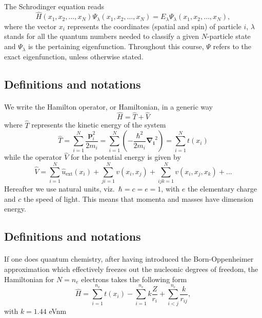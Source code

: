 \documentclass[%
twoside,                 %
final,                   %
10pt]{article}
\begin{document}
\paragraph{}
The Schrodinger equation reads 
\begin{equation}
\hat{H}(x_1, x_2, \dots , x_N) \Psi_{\lambda}(x_1, x_2, \dots , x_N) = 
E_\lambda  \Psi_\lambda(x_1, x_2, \dots , x_N), \label{eq:basicSE1}
\end{equation}
where the vector $x_i$ represents the coordinates (spatial and spin) of particle $i$, $\lambda$ stands  for all the quantum
numbers needed to classify a given $N$-particle state and $\Psi_{\lambda}$ is the pertaining eigenfunction.  Throughout this course,
$\Psi$ refers to the exact eigenfunction, unless otherwise stated.



\subsection{Definitions and notations}

\paragraph{}
We write the Hamilton operator, or Hamiltonian,  in a generic way 
\[
	\hat{H} = \hat{T} + \hat{V} 
\]
where $\hat{T}$  represents the kinetic energy of the system
\[
	\hat{T} = \sum_{i=1}^N \frac{\mathbf{p}_i^2}{2m_i} = \sum_{i=1}^N \left( -\frac{\hbar^2}{2m_i} \mathbf{\nabla_i}^2 \right) =
		\sum_{i=1}^N t(x_i)
\]
while the operator $\hat{V}$ for the potential energy is given by
\begin{equation}
	\hat{V} = \sum_{i=1}^N \hat{u}_{\mathrm{ext}}(x_i) + \sum_{ji=1}^N v(x_i,x_j)+\sum_{ijk=1}^Nv(x_i,x_j,x_k)+\dots
\label{eq:firstv}
\end{equation}
Hereafter we use natural units, viz.~$\hbar=c=e=1$, with $e$ the elementary charge and $c$ the speed of light. This means that momenta and masses
have dimension energy.




\subsection{Definitions and notations}

\paragraph{}
If one does quantum chemistry, after having introduced the  Born-Oppenheimer approximation which effectively freezes out the nucleonic degrees of freedom, the Hamiltonian for $N=n_e$ electrons takes the following form 
\[
  \hat{H} = \sum_{i=1}^{n_e} t(x_i) - \sum_{i=1}^{n_e} k\frac{Z}{r_i} + \sum_{i < j}^{n_e} \frac{k}{r_{ij}},
\]
with $k=1.44$ eVnm
\end{document}
